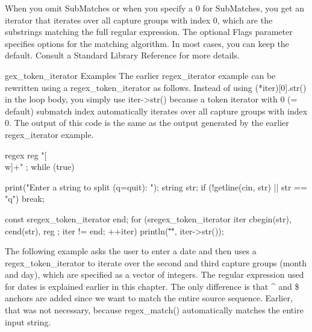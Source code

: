 When you omit SubMatches or when you specify a 0 for SubMatches, you get an iterator that iterates over all capture groups with index 0, which are the substrings matching the full regular expression. The optional Flags parameter specifies options for the matching algorithm. In most cases, you can keep the default. Consult a Standard Library Reference for more details.


gex\_token\_iterator Examples The earlier regex\_iterator example can be rewritten using a regex\_token\_iterator as follows. Instead of using (*iter)[0].str() in the loop body, you simply use iter->str() because a token iterator with 0 (= default) submatch index automatically iterates over all capture groups with index 0. The output of this code is the same as the output generated by the earlier regex\_iterator example.

\begin{cpp}
regex reg { "[\\w]+" };
while (true) {
    print("Enter a string to split (q=quit): ");
    string str;
    if (!getline(cin, str) || str == "q") { break; }

    const sregex_token_iterator end;
    for (sregex_token_iterator iter { cbegin(str), cend(str), reg };
    iter != end; ++iter) {
        println("\"{}\"", iter->str());
    }
}
\end{cpp}

The following example asks the user to enter a date and then uses a regex\_token\_iterator to iterate over the second and third capture groups (month and day), which are specified as a vector of integers. The regular expression used for dates is explained earlier in this chapter. The only difference is that \^{} and \$ anchors are added since we want to match the entire source sequence. Earlier, that was not necessary, because regex\_match() automatically matches the entire input string.


